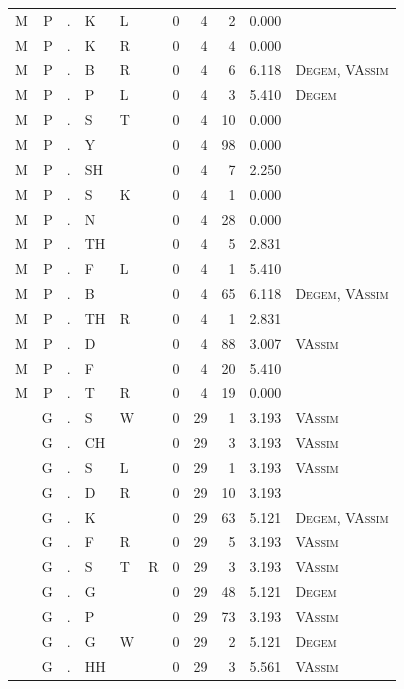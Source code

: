 \documentclass[12pt]{article}
\begin{document}
\begin{longtable}{r@{ } r@{ } c@{ } l@{ } l@{ } l@{ } r r r r l }
M & P & . & K & L &  & 0 & 4 & 2 & 0.000 &  \\
M & P & . & K & R &  & 0 & 4 & 4 & 0.000 &  \\
M & P & . & B & R &  & 0 & 4 & 6 & 6.118 & \textsc{Degem}, \textsc{VAssim} \\
M & P & . & P & L &  & 0 & 4 & 3 & 5.410 & \textsc{Degem} \\
M & P & . & S & T &  & 0 & 4 & 10 & 0.000 &  \\
M & P & . & Y &  &  & 0 & 4 & 98 & 0.000 &  \\
M & P & . & SH &  &  & 0 & 4 & 7 & 2.250 &  \\
M & P & . & S & K &  & 0 & 4 & 1 & 0.000 &  \\
M & P & . & N &  &  & 0 & 4 & 28 & 0.000 &  \\
M & P & . & TH &  &  & 0 & 4 & 5 & 2.831 &  \\
M & P & . & F & L &  & 0 & 4 & 1 & 5.410 &  \\
M & P & . & B &  &  & 0 & 4 & 65 & 6.118 & \textsc{Degem}, \textsc{VAssim} \\
M & P & . & TH & R &  & 0 & 4 & 1 & 2.831 &  \\
M & P & . & D &  &  & 0 & 4 & 88 & 3.007 & \textsc{VAssim} \\
M & P & . & F &  &  & 0 & 4 & 20 & 5.410 &  \\
M & P & . & T & R &  & 0 & 4 & 19 & 0.000 &  \\
 & G & . & S & W &  & 0 & 29 & 1 & 3.193 & \textsc{VAssim} \\
 & G & . & CH &  &  & 0 & 29 & 3 & 3.193 & \textsc{VAssim} \\
 & G & . & S & L &  & 0 & 29 & 1 & 3.193 & \textsc{VAssim} \\
 & G & . & D & R &  & 0 & 29 & 10 & 3.193 &  \\
 & G & . & K &  &  & 0 & 29 & 63 & 5.121 & \textsc{Degem}, \textsc{VAssim} \\
 & G & . & F & R &  & 0 & 29 & 5 & 3.193 & \textsc{VAssim} \\
 & G & . & S & T & R & 0 & 29 & 3 & 3.193 & \textsc{VAssim} \\
 & G & . & G &  &  & 0 & 29 & 48 & 5.121 & \textsc{Degem} \\
 & G & . & P &  &  & 0 & 29 & 73 & 3.193 & \textsc{VAssim} \\
 & G & . & G & W &  & 0 & 29 & 2 & 5.121 & \textsc{Degem} \\
 & G & . & HH &  &  & 0 & 29 & 3 & 5.561 & \textsc{VAssim} \\

\end{longtable}
\end{document}
